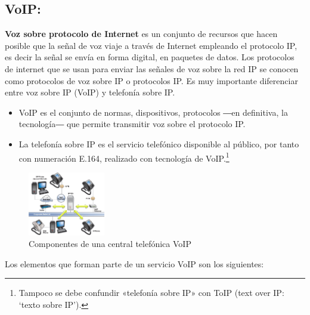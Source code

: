 \documentclass[conference]{IEEEtran}
\begin{document}
\subsection{\textbf{ VoIP:}}
\textbf{Voz sobre protocolo de Internet} es un conjunto de recursos que hacen posible que la señal de voz viaje a través de Internet empleando el protocolo IP, es decir la señal se envía en forma digital, en paquetes de datos. Los protocolos de internet que se usan para enviar las señales de voz sobre la red IP se conocen como protocolos de voz sobre IP o protocolos IP.
Es muy importante diferenciar entre voz sobre IP (VoIP) y telefonía sobre IP.
\begin{itemize}
\item VoIP es el conjunto de normas, dispositivos, protocolos ―en definitiva, la tecnología― que permite transmitir voz sobre el protocolo IP.
\item La telefonía sobre IP es el servicio telefónico disponible al público, por tanto con numeración E.164, realizado con tecnología de VoIP.\footnote{Tampoco se debe confundir «telefonía sobre IP» con ToIP (text over IP: ‘texto sobre IP’).}
\end{itemize}
\begin{figure}[h]
	\centerline{\includegraphics[width=0.3\textwidth]{img/voip01.jpg}}
	\caption{Componentes de una central telefónica VoIP}
	\label{fig:ant00}
\end{figure}
Los elementos que forman parte de un servicio VoIP son los siguientes:
\end{document}
